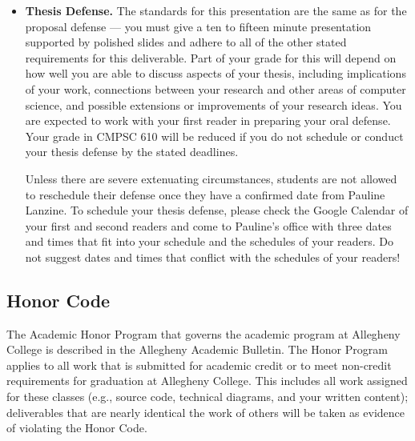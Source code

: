 \begin{itemize}
  \item{\bf Thesis Defense.} The standards for this presentation are the same as for the proposal defense --- you must
    give a ten to fifteen minute presentation supported by polished slides and adhere to all of the other stated
    requirements for this deliverable.  Part of your grade for this will depend on how well you are able to discuss
    aspects of your thesis, including implications of your work, connections between your research and other areas of
    computer science, and possible extensions or improvements of your research ideas.  You are expected to work with
    your first reader in preparing your oral defense.  Your grade in CMPSC 610 will be reduced if you do not schedule or
    conduct your thesis defense by the stated deadlines.

    Unless there are severe extenuating circumstances, students are not allowed to reschedule their defense once they
    have a confirmed date from Pauline Lanzine. To schedule your thesis defense, please check the Google Calendar of
    your first and second readers and come to Pauline's office with three dates and times that fit into your schedule
    and the schedules of your readers. Do not suggest dates and times that conflict with the schedules of your readers!

\end{itemize}



\vspace*{-.25in}
\subsection*{Honor Code}
\vspace*{-.1in}

The Academic Honor Program that governs the academic program at Allegheny College is described in the Allegheny
Academic Bulletin. The Honor Program applies to all work that is submitted for academic credit or to meet non-credit
requirements for graduation at Allegheny College. This includes all work assigned for these classes (e.g., source code,
technical diagrams, and your written content); deliverables that are nearly identical the work of others will be taken
as evidence of violating the Honor Code.

